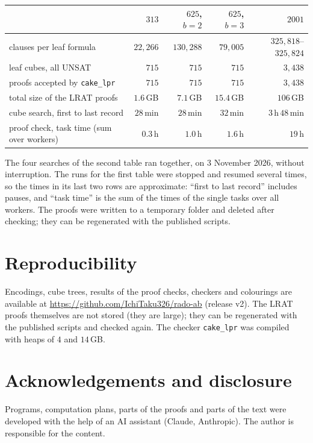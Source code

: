 \documentclass[11pt,a4paper]{article}
\theoremstyle{definition}
\theoremstyle{remark}
\begin{document}
\begin{center}
\footnotesize
\renewcommand{\arraystretch}{1.0}
\begin{tabular}{lrrrr}
\toprule
 & $313$ & $625$, $b=2$ & $625$, $b=3$ & $2001$\\
\midrule
clauses per leaf formula & $22{,}266$ & $130{,}288$ & $79{,}005$ & $325{,}818$--$325{,}824$\\
leaf cubes, all UNSAT & $715$ & $715$ & $715$ & $3{,}438$\\
proofs accepted by \texttt{cake\_lpr} & $715$ & $715$ & $715$ & $3{,}438$\\
total size of the LRAT proofs & $1.6$\,GB & $7.1$\,GB & $15.4$\,GB & $106$\,GB\\
cube search, first to last record & $28$\,min & $28$\,min & $32$\,min & $3$\,h\,$48$\,min\\
proof check, task time (sum over workers) & $0.3$\,h & $1.0$\,h & $1.6$\,h & $19$\,h\\
\bottomrule
\end{tabular}
\end{center}
The four searches of the second table ran together, on 3 November 2026, without interruption. The runs for the first table were stopped and resumed several times, so the times in its last two rows are approximate: ``first to last record'' includes pauses, and ``task time'' is the sum of the times of the single tasks over all workers. The proofs were written to a temporary folder and deleted after checking; they can be regenerated with the published scripts.

\section{Reproducibility}
Encodings, cube trees, results of the proof checks, checkers and colourings are available at \url{https://github.com/IchiTaku326/rado-ab} (release v2). The LRAT proofs themselves are not stored (they are large); they can be regenerated with the published scripts and checked again. The checker \texttt{cake\_lpr} was compiled with heaps of $4$ and $14$\,GB.

\section*{Acknowledgements and disclosure}
Programs, computation plans, parts of the proofs and parts of the text were developed with the help of an AI assistant (Claude, Anthropic). The author is responsible for the content.
\end{document}
